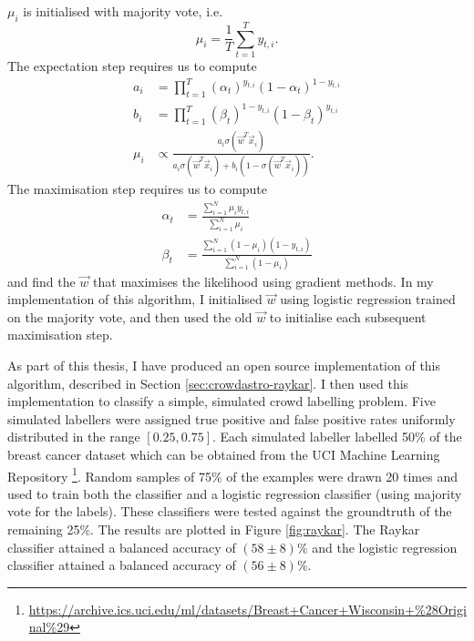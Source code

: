             $\mu_i$ is initialised with majority vote, i.e.
            \begin{equation*}
                \mu_i = \frac{1}{T} \sum_{t = 1}^T y_{t, i}.
            \end{equation*}
            The expectation step requires us to compute
            \begin{align*}
                a_i &= \prod_{t = 1}^T (\alpha_t)^{y_{t, i}} (1 - \alpha_t)^{1 - y_{t, i}}\\
                b_i &= \prod_{t = 1}^T (\beta_t)^{1 - y_{t, i}} (1 - \beta_t)^{y_{t, i}}\\
                \mu_i &\propto \frac{a_i \sigma(\vec w^T \vec x_i)}{a_i \sigma(\vec w^T \vec x_i) + b_i (1 - \sigma(\vec w^T \vec x_i))}.
            \end{align*}
            The maximisation step requires us to compute
            \begin{align}
                \label{eq:raykar-alpha}
                \alpha_t &= \frac{\sum_{i = 1}^N \mu_i y_{t, i}}{\sum_{i = 1}^N \mu_i}\\
                \label{eq:raykar-beta}
                \beta_t &= \frac{\sum_{i = 1}^N (1 - \mu_i) (1 - y_{t, i})}{\sum_{i = 1}^N (1 - \mu_i)}
            \end{align}
            and find the $\vec w$ that maximises the likelihood using gradient methods. In my implementation of this algorithm, I initialised $\vec w$ using logistic regression trained on the majority vote, and then used the old $\vec w$ to initialise each subsequent maximisation step.

            As part of this thesis, I have produced an open source implementation of this algorithm, described in Section \ref{sec:crowdastro-raykar}. I then used this implementation to classify a simple, simulated crowd labelling problem. Five simulated labellers were assigned true positive and false positive rates uniformly distributed in the range $[0.25, 0.75]$. Each simulated labeller labelled 50\% of the breast cancer dataset \citep{wolberg90} which can be obtained from the UCI Machine Learning Repository \citep{lichman13}\footnote{\url{https://archive.ics.uci.edu/ml/datasets/Breast+Cancer+Wisconsin+\%28Original\%29}}. Random samples of 75\% of the examples were drawn 20 times and used to train both the \citeauthor{raykar10} classifier and a logistic regression classifier (using majority vote for the labels). These classifiers were tested against the groundtruth of the remaining 25\%. The results are plotted in Figure \ref{fig:raykar}. The Raykar classifier attained a balanced accuracy of $(58 \pm 8)\%$ and the logistic regression classifier attained a balanced accuracy of $(56 \pm 8)\%$.

